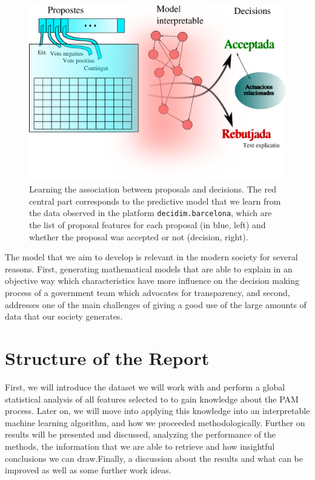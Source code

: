 \begin{figure}[t]
\centering
\includegraphics[width=.7\textwidth]{Figures/task.eps}
\caption{Learning the association between proposals and decisions.
The red central part corresponds to the predictive model that we learn from the data observed in the platform \texttt{decidim.barcelona}, which are the list of proposal features for each proposal (in blue, left) and whether the proposal was accepted or not (decision, right).}
\label{fig:task}
\end{figure}

The model that we aim to develop is relevant in the modern society for several reasons. First, generating mathematical models that are able to explain in an objective way which characteristics have more influence on the decision making process of a government team which advocates for transparency, and second, addresses one of the main challenges of giving a good use of the large amounts of data that our society generates.  

\section{Structure of the Report}

First, we will introduce the dataset we will work with and perform a global statistical analysis of all features selected to to gain knowledge about the PAM process. Later on, we will move into applying this knowledge into an interpretable machine learning algorithm, and how we proceeded methodologically. Further on results will be presented and discussed, analyzing the performance of the methods, the information that we are able to retrieve and how insightful conclusions we can draw.Finally, a discussion about the results and what can be improved as well as some further work
ideas.

\newpage


